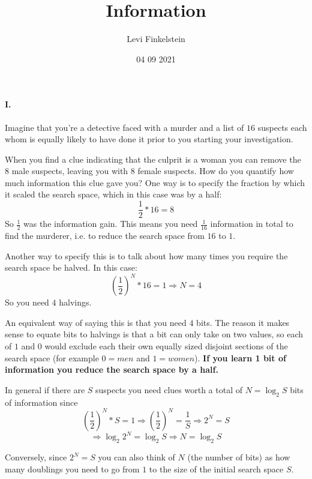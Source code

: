 \title{Information}
\author{Levi Finkelstein}
\date{04 09 2021}


\maketitle

\paragraph{I.}
Imagine that you're a detective faced with a murder and a list of $16$ suspects each whom is equally likely to have done it prior to you starting your investigation. 
\par
When you find a clue indicating that the culprit is a woman you can remove the $8$ male suspects, leaving you with $8$ female suspects. How do you quantify how much information this clue gave you? One way is to specify the fraction by which it scaled the search space, which in this case was by a half:
$$\frac{1}{2}*16 = 8$$
So $\frac{1}{2}$ was the information gain. This means you need $\frac{1}{16}$ information in total to find the murderer, i.e. to reduce the search space from $16$ to $1$.
\par
Another way to specify this is to talk about how many times you require the search space be halved. In this case:
$$(\frac{1}{2})^N*16 = 1 \Rightarrow N=4$$ 
So you need $4$ halvings. 
\par
An equivalent way of saying this is that you need $4$ bits. The reason it makes sense to equate bits to halvings is that a bit can only take on two values, so each of $1$ and $0$ would exclude each their own equally sized disjoint sections of the search space (for example $0=men$ and $1=women$). \textbf{If you learn 1 bit of information you reduce the search space by a half.}
\par
In general if there are $S$ suspects you need clues worth a total of $N=\log_2{S}$ bits of information since 
$$(\frac{1}{2})^N*S=1 \Rightarrow (\frac{1}{2})^N=\frac{1}{S}\Rightarrow 2^N=S$$
$$\Rightarrow \log_2{2^N}=\log_2{S} \Rightarrow N = \log_2{S}$$

Conversely, since $2^N = S$ you can also think of $N$ (the number of bits) as how many doublings you need to go from $1$ to the size of the initial search space $S$.
